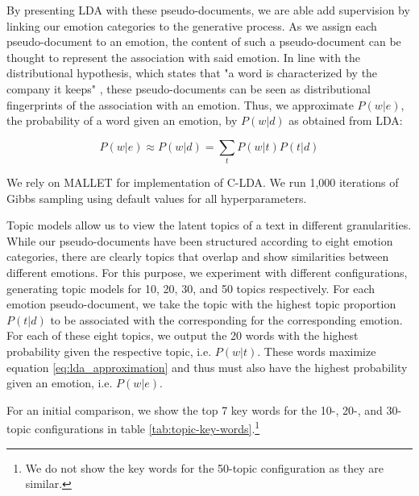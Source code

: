 By presenting LDA with these pseudo-documents, we are able add supervision by linking our emotion categories to the generative process. As we assign each pseudo-document to an emotion, the content of such a pseudo-document can be thought to represent the association with said emotion. In line with the distributional hypothesis, which states that "a word is characterized by the company it keeps" \cite{firth}, these pseudo-documents can be seen as distributional fingerprints of the association with an emotion. Thus, we approximate $P(w|e)$, the probability of a word given an emotion, by $P(w|d)$ as obtained from LDA:

\begin{equation} \label{eq:lda_approximation}
P(w|e) \approx P(w|d) = \sum_t P(w|t) P(t|d)
\end{equation}

We rely on MALLET \cite{mallet} for implementation of C-LDA. We run 1,000 iterations of Gibbs sampling using default values for all hyperparameters.

Topic models allow us to view the latent topics of a text in different granularities. While our pseudo-documents have been structured according to eight emotion categories, there are clearly topics that overlap and show similarities between different emotions. For this purpose, we experiment with different configurations, generating topic models for 10, 20, 30, and 50 topics respectively. For each emotion pseudo-document, we take the topic with the highest topic proportion $P(t|d)$ to be associated with the corresponding for the corresponding emotion. For each of these eight topics, we output the 20 words with the highest probability given the respective topic, i.e. $P(w|t)$. These words maximize equation \ref{eq:lda_approximation} and thus must also have the highest probability given an emotion, i.e. $P(w|e)$.

For an initial comparison, we show the top 7 key words for the 10-, 20-, and 30-topic configurations in table \ref{tab:topic-key-words}.\footnote{We do not show the key words for the 50-topic configuration as they are similar.}

